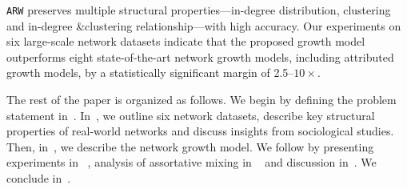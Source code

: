 \texttt{ARW} preserves
multiple structural properties---in-degree distribution, clustering and
in-degree \&clustering relationship---with high accuracy.
Our experiments on six large-scale network datasets indicate that the proposed growth model outperforms
eight state-of-the-art network growth models, including attributed growth models, by a
statistically significant margin of 2.5--$10\times$.

The rest of the paper is organized as follows.
We begin by defining the problem statement in~.
In~, we outline six network datasets, describe key structural
properties of real-world networks and discuss insights from sociological studies.
Then, in~, we describe the network growth model. We follow
by presenting experiments in ~, analysis of assortative mixing
in ~ and discussion in~.
We conclude in~.

